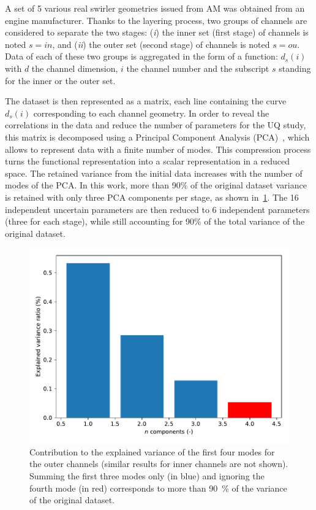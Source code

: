 A set of 5 various real swirler geometries issued from AM was obtained from an engine manufacturer. Thanks to the layering process, two groups of channels are considered to separate the two stages: (\emph{i}) the inner set (first stage) of channels is noted $s=in$, and (\emph{ii}) the outer set (second stage) of channels is noted $s=ou$. Data of each of these two groups is aggregated in the form of a function: $d_{s}(i)$ with $d$ the channel dimension, $i$ the channel number and the subscript $s$ standing for the inner or the outer set. 

The dataset is then represented as a matrix, each line containing the curve $d_{s}(i)$ corresponding to each channel geometry. In order to reveal the correlations in the data and reduce the number of parameters for the UQ study, this matrix is decomposed using a Principal Component Analysis (PCA)~\cite{AnindyaChatterjee2000}, which allows to represent data with a finite number of modes. This compression process turns the functional representation into a scalar representation in a reduced space. The retained variance from the initial data increases with the number of modes of the PCA. In this work, more than 90\% of the original dataset variance is retained with only three PCA components per stage, as shown in~\cref{fig:variance}. The 16 independent uncertain parameters are then reduced to 6 independent parameters (three for each stage), while still accounting for 90\% of the total variance of the original dataset. 

\begin{figure}[!h]
\centering
\includegraphics[width=0.7\linewidth,height=\textheight,keepaspectratio]{fig/applications/swirler/variance_ratio.pdf}
\caption{Contribution to the explained variance of the first four modes for the outer channels (similar results for inner channels are not shown). Summing the first three modes only (in blue) and ignoring the fourth mode (in red) corresponds to more than 90~\% of the variance of the original dataset.}
\label{fig:variance}
\end{figure}

